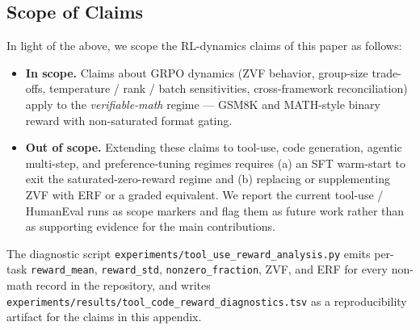 \subsection{Scope of Claims}
\label{subsec:scope-of-claims}

In light of the above, we scope the RL-dynamics claims of this paper
as follows:
\begin{itemize}
  \item \textbf{In scope.} Claims about GRPO dynamics (ZVF behavior,
        group-size trade-offs, temperature / rank / batch
        sensitivities, cross-framework reconciliation) apply to the
        \emph{verifiable-math} regime — GSM8K and MATH-style binary
        reward with non-saturated format gating.
  \item \textbf{Out of scope.} Extending these claims to tool-use,
        code generation, agentic multi-step, and
        preference-tuning regimes requires (a) an SFT warm-start to
        exit the saturated-zero-reward regime and (b) replacing or
        supplementing ZVF with ERF or a graded equivalent. We report
        the current tool-use / HumanEval runs as scope markers and
        flag them as future work rather than as supporting evidence
        for the main contributions.
\end{itemize}
The diagnostic script
\texttt{experiments/tool\_use\_reward\_analysis.py} emits per-task
\texttt{reward\_mean}, \texttt{reward\_std}, \texttt{nonzero\_fraction},
ZVF, and ERF for every non-math record in the repository, and writes
\texttt{experiments/results/tool\_code\_reward\_diagnostics.tsv} as a
reproducibility artifact for the claims in this appendix.
